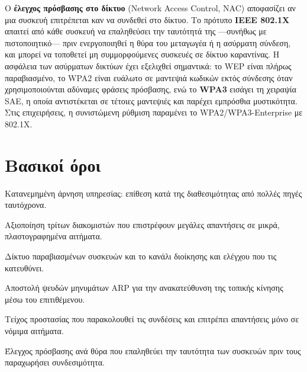 \documentclass[11pt,openany]{book}
\begin{document}
Ο \textbf{έλεγχος πρόσβασης στο δίκτυο} (Network Access Control, NAC) αποφασίζει αν μια συσκευή επιτρέπεται καν να συνδεθεί στο δίκτυο. Το πρότυπο \textbf{IEEE 802.1X} απαιτεί από κάθε συσκευή να επαληθεύσει την ταυτότητά της —συνήθως με πιστοποιητικό— πριν ενεργοποιηθεί η θύρα του μεταγωγέα ή η ασύρματη σύνδεση, και μπορεί να τοποθετεί μη συμμορφούμενες συσκευές σε δίκτυο καραντίνας. Η ασφάλεια των ασύρματων δικτύων έχει εξελιχθεί σημαντικά: το WEP είναι πλήρως παραβιασμένο, το WPA2 είναι ευάλωτο σε μαντεψιά κωδικών εκτός σύνδεσης όταν χρησιμοποιούνται αδύναμες φράσεις πρόσβασης, ενώ το \textbf{WPA3} εισάγει τη χειραψία SAE, η οποία αντιστέκεται σε τέτοιες μαντεψιές και παρέχει εμπρόσθια μυστικότητα. Στις επιχειρήσεις, η συνιστώμενη ρύθμιση παραμένει το WPA2/WPA3-Enterprise με 802.1X.

\section*{Βασικοί όροι}
\begin{description}[style=nextline,leftmargin=1.2em]
  \item[DDoS] Κατανεμημένη άρνηση υπηρεσίας: επίθεση κατά της διαθεσιμότητας από πολλές πηγές ταυτόχρονα.
  \item[Ενίσχυση] Αξιοποίηση τρίτων διακομιστών που επιστρέφουν μεγάλες απαντήσεις σε μικρά, πλαστογραφημένα αιτήματα.
  \item[Botnet / C2] Δίκτυο παραβιασμένων συσκευών και το κανάλι διοίκησης και ελέγχου που τις κατευθύνει.
  \item[Πλαστογράφηση ARP] Αποστολή ψευδών μηνυμάτων ARP για την ανακατεύθυνση της τοπικής κίνησης μέσω του επιτιθέμενου.
  \item[Τείχος προστασίας με κατάσταση] Τείχος προστασίας που παρακολουθεί τις συνδέσεις και επιτρέπει απαντήσεις μόνο σε νόμιμα αιτήματα.
  \item[802.1X] Έλεγχος πρόσβασης ανά θύρα που επαληθεύει την ταυτότητα των συσκευών πριν τους παραχωρήσει συνδεσιμότητα.
\end{description}
\end{document}
